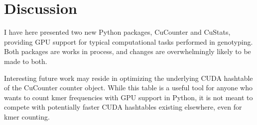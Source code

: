 \section*{Discussion}
I have here presented two new Python packages, CuCounter and CuStats, providing GPU support for typical computational tasks performed in genotyping.
Both packages are works in process, and changes are overwhelmingly likely to be made to both.

Interesting future work may reside in optimizing the underlying CUDA hashtable of the CuCounter counter object. 
While this table is a useful tool for anyone who wants to count kmer frequencies with GPU support in Python, it is not meant to compete with potentially faster CUDA hashtables existing elsewhere, even for kmer counting.
